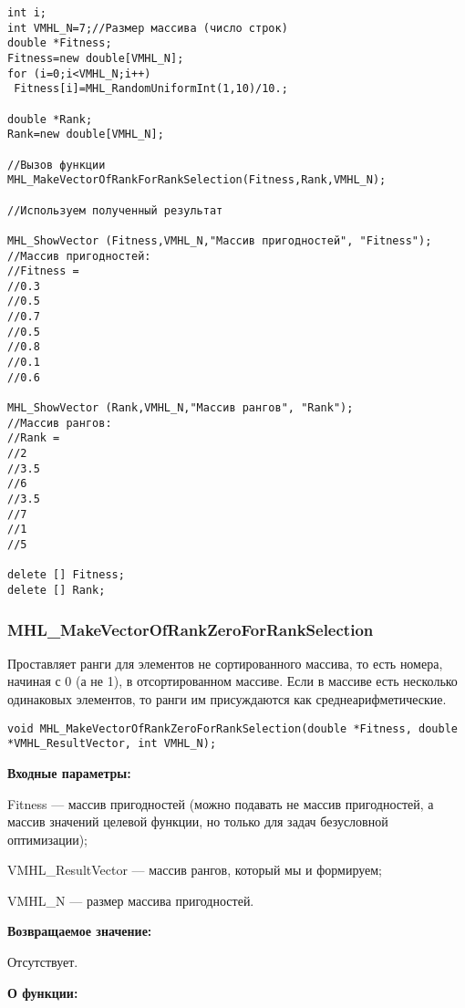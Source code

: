 \documentclass[a4paper,12pt]{article}
\begin{document}
\begin{lstlisting}[label=code_use_MHL_MakeVectorOfRankForRankSelection,caption=Пример использования]
int i;
int VMHL_N=7;//Размер массива (число строк)
double *Fitness;
Fitness=new double[VMHL_N];
for (i=0;i<VMHL_N;i++)
 Fitness[i]=MHL_RandomUniformInt(1,10)/10.;

double *Rank;
Rank=new double[VMHL_N];

//Вызов функции
MHL_MakeVectorOfRankForRankSelection(Fitness,Rank,VMHL_N);

//Используем полученный результат

MHL_ShowVector (Fitness,VMHL_N,"Массив пригодностей", "Fitness");
//Массив пригодностей:
//Fitness =
//0.3
//0.5
//0.7
//0.5
//0.8
//0.1
//0.6

MHL_ShowVector (Rank,VMHL_N,"Массив рангов", "Rank");
//Массив рангов:
//Rank =
//2
//3.5
//6
//3.5
//7
//1
//5

delete [] Fitness;
delete [] Rank;
\end{lstlisting}

\subsubsection{MHL\_MakeVectorOfRankZeroForRankSelection}\label{MHL_MakeVectorOfRankZeroForRankSelection}

Проставляет ранги для элементов не сортированного массива, то есть номера, начиная с 0 (а не 1), в отсортированном массиве.  Если в массиве есть несколько одинаковых элементов, то ранги им присуждаются как среднеарифметические.


\begin{lstlisting}[label=code_syntax_MHL_MakeVectorOfRankZeroForRankSelection,caption=Синтаксис]
void MHL_MakeVectorOfRankZeroForRankSelection(double *Fitness, double *VMHL_ResultVector, int VMHL_N);
\end{lstlisting}

\textbf{Входные параметры:}

 Fitness --- массив пригодностей (можно подавать не массив пригодностей, а массив значений целевой функции, но только для задач безусловной оптимизации);
 
 VMHL\_ResultVector --- массив рангов, который мы и формируем;
 
 VMHL\_N --- размер массива пригодностей.
 
\textbf{Возвращаемое значение:} 
 
Отсутствует.
 
\textbf{О функции:}
\end{document}
